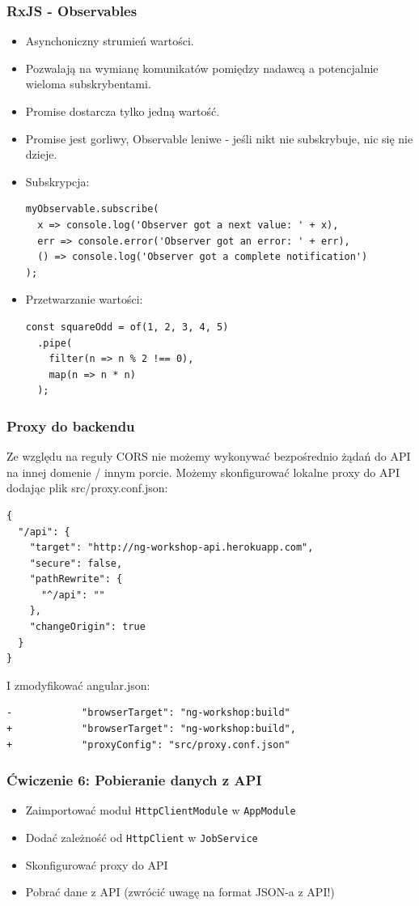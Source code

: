 \documentclass{beamer}
\begin{document}
\begin{frame}[fragile]
    \frametitle{RxJS - Observables}
    \begin{itemize}
        \item Asynchoniczny strumień wartości.
        \item Pozwalają na wymianę komunikatów pomiędzy nadawcą a potencjalnie wieloma subskrybentami.
        \item Promise dostarcza tylko jedną wartość.
        \item Promise jest gorliwy, Observable leniwe - jeśli nikt nie subskrybuje, nic się nie dzieje.
        \item Subskrypcja:
\begin{lstlisting}
myObservable.subscribe(
  x => console.log('Observer got a next value: ' + x),
  err => console.error('Observer got an error: ' + err),
  () => console.log('Observer got a complete notification')
);
\end{lstlisting}
        \item Przetwarzanie wartości:
\begin{lstlisting}
const squareOdd = of(1, 2, 3, 4, 5)
  .pipe(
    filter(n => n % 2 !== 0),
    map(n => n * n)
  );
\end{lstlisting}
    \end{itemize}
\end{frame}

\begin{frame}[fragile]
    \frametitle{Proxy do backendu}
    Ze względu na reguły CORS nie możemy wykonywać bezpośrednio żądań do API na innej domenie / innym porcie.
    Możemy skonfigurować lokalne proxy do API dodając plik src/proxy.conf.json:
\begin{lstlisting}
{
  "/api": {
    "target": "http://ng-workshop-api.herokuapp.com",
    "secure": false,
    "pathRewrite": {
      "^/api": ""
    },
    "changeOrigin": true
  }
}
\end{lstlisting}
    I zmodyfikować angular.json:
\begin{lstlisting}
-            "browserTarget": "ng-workshop:build"
+            "browserTarget": "ng-workshop:build",
+            "proxyConfig": "src/proxy.conf.json"
\end{lstlisting}

\end{frame}

\begin{frame}
    \frametitle{Ćwiczenie 6: Pobieranie danych z API}
    \begin{itemize}
        \item Zaimportować moduł \lstinline{HttpClientModule} w \lstinline{AppModule}
        \item Dodać zależność od \lstinline{HttpClient} w \lstinline{JobService}
        \item Skonfigurować proxy do API
        \item Pobrać dane z API (zwrócić uwagę na format JSON-a z API!)
    \end{itemize}
\end{frame}
\end{document}
